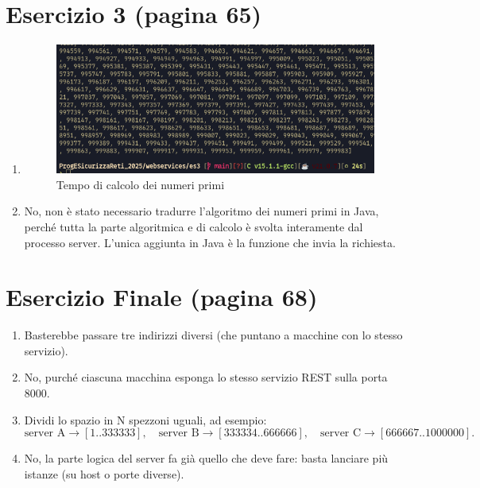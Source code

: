 \documentclass[a4paper,12pt]{article}
\begin{document}
\section*{Esercizio 3 (pagina 65)}
\begin{enumerate}
  \item
    \begin{figure}[h]
      \centering
      \includegraphics[width=0.6\linewidth]{timer.png}
      \caption{Tempo di calcolo dei numeri primi}
    \end{figure}
  \item No, non è stato necessario tradurre l’algoritmo dei numeri primi in Java, perché tutta la parte algoritmica e di calcolo è svolta interamente dal processo server. L'unica aggiunta in Java è la funzione che invia la richiesta.
\end{enumerate}

\section*{Esercizio Finale (pagina 68)}
\begin{enumerate}
  \item Basterebbe passare tre indirizzi diversi (che puntano a macchine con lo stesso servizio).
  \item No, purché ciascuna macchina esponga lo stesso servizio REST sulla porta 8000.
  \item Dividi lo spazio in N spezzoni uguali, ad esempio:
    \[
      \text{server A} \to [1..333333],\quad
      \text{server B} \to [333334..666666],\quad
      \text{server C} \to [666667..1000000].
    \]
  \item No, la parte logica del server fa già quello che deve fare: basta lanciare più istanze (su host o porte diverse).
\end{enumerate}
\end{document}

